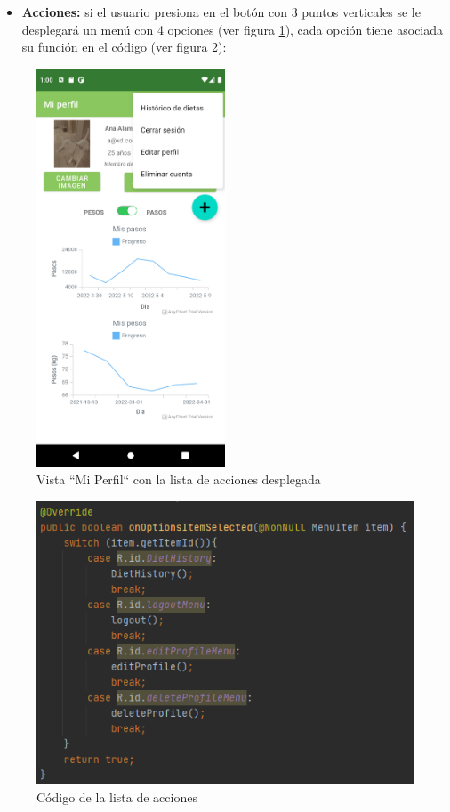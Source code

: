 \begin{itemize}
    \item \textbf{Acciones:} si el usuario presiona en el botón con 3 puntos verticales se le desplegará un menú con 4 opciones (ver figura \ref{fig:opt}), cada opción tiene asociada su función en el código (ver figura \ref{fig:optcode}):
\end{itemize}    

\begin{figure}[H]
    \centering
    \includegraphics[width=0.5\textwidth]{Images/Capitulo7/opt.png}
    \caption{Vista ``Mi Perfil`` con la lista de acciones desplegada}
    \label{fig:opt}
\end{figure}
\begin{figure}[H]
    \centering
    \includegraphics[width=\textwidth]{Images/Capitulo7/optcode.png}
    \caption{Código de la lista de acciones}
    \label{fig:optcode}
\end{figure}
    
